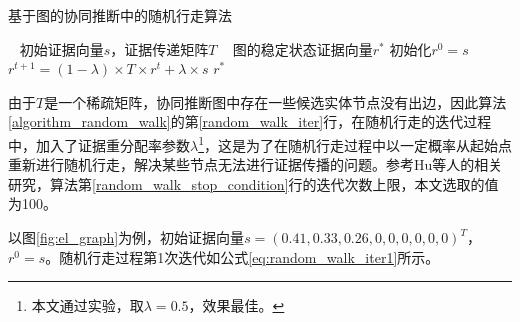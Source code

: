 \renewcommand{\algorithmicrequire}{\textbf{输入:}} %
\renewcommand{\algorithmicensure}{\textbf{输出:}} %
\begin{algorithm}[!htb]
	\caption{基于图的协同推断中的随机行走算法}
	\label{algorithm_random_walk}
	\begin{algorithmic}[1] %
		\REQUIRE ~ %
		初始证据向量$s$，证据传递矩阵$T$
		\ENSURE ~ %
		图的稳定状态证据向量$r^*$
		\STATE 初始化$r^0=s$
		\REPEAT
		\STATE $r^{t+1}=(1-\lambda)\times T\times r^t + \lambda \times s$\label{random_walk_iter}
		\label{random_walk_stop_condition}
		\RETURN $r^*$
	\end{algorithmic}
\end{algorithm}

由于$T$是一个稀疏矩阵，协同推断图中存在一些候选实体节点没有出边，因此算法\ref{algorithm_random_walk}的第\ref{random_walk_iter}行，在随机行走的迭代过程中，加入了证据重分配率参数$\lambda$\footnote{本文通过实验，取$\lambda=0.5$，效果最佳。}，这是为了在随机行走过程中以一定概率从起始点重新进行随机行走，解决某些节点无法进行证据传播的问题。参考Hu等人\cite{hu2009understanding}的相关研究，算法第\ref{random_walk_stop_condition}行的迭代次数上限，本文选取的值为100。

以图\ref{fig:el_graph}为例，初始证据向量$s=\left( 0.41,0.33,0.26,0,0,0,0,0,0\right)^T $，$r^0=s$。随机行走过程第1次迭代如公式\ref{eq:random_walk_iter1}所示。

